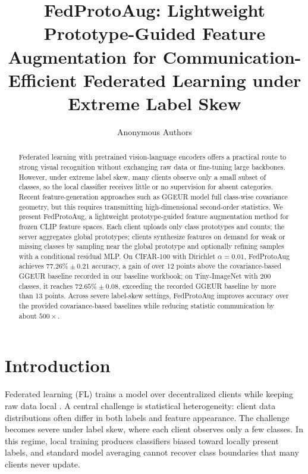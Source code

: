 ﻿\documentclass[runningheads]{llncs}
\newcommand{\method}{FedProtoAug}
\newcommand{\clip}{CLIP}
\begin{document}
\title{\method: Lightweight Prototype-Guided Feature Augmentation for Communication-Efficient Federated Learning under Extreme Label Skew}

\author{Anonymous Authors}

\maketitle

\begin{abstract}
Federated learning with pretrained vision-language encoders offers a practical route to strong visual recognition without exchanging raw data or fine-tuning large backbones. However, under extreme label skew, many clients observe only a small subset of classes, so the local classifier receives little or no supervision for absent categories. Recent feature-generation approaches such as GGEUR model full class-wise covariance geometry, but this requires transmitting high-dimensional second-order statistics. We present \method, a lightweight prototype-guided feature augmentation method for frozen \clip{} feature spaces. Each client uploads only class prototypes and counts; the server aggregates global prototypes; clients synthesize features on demand for weak or missing classes by sampling near the global prototype and optionally refining samples with a conditional residual MLP. On CIFAR-100 with Dirichlet $\alpha=0.01$, \method{} achieves $77.26\%\pm0.21$ accuracy, a gain of over 12 points above the covariance-based GGEUR baseline recorded in our baseline workbook; on Tiny-ImageNet with 200 classes, it reaches $72.65\%\pm0.08$, exceeding the recorded GGEUR baseline by more than 13 points. Across severe label-skew settings, \method{} improves accuracy over the provided covariance-based baselines while reducing statistic communication by about $500\times$.
\end{abstract}


\section{Introduction}

Federated learning (FL) trains a model over decentralized clients while keeping raw data local \cite{mcmahan2017fedavg}. A central challenge is statistical heterogeneity: client data distributions often differ in both labels and feature appearance. The challenge becomes severe under label skew, where each client observes only a few classes. In this regime, local training produces classifiers biased toward locally present labels, and standard model averaging cannot recover class boundaries that many clients never update.
\end{document}
